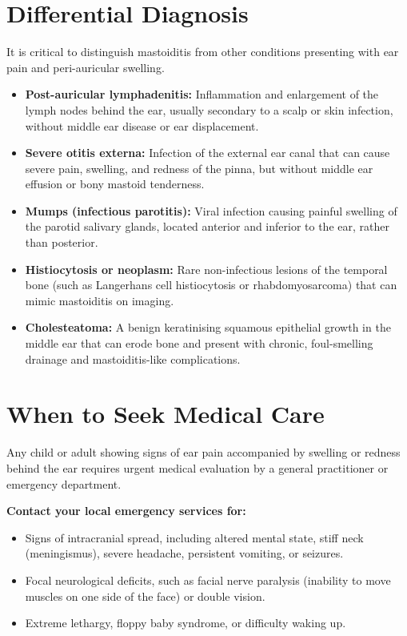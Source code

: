\section*{Differential Diagnosis}
It is critical to distinguish mastoiditis from other conditions presenting with ear pain and peri-auricular swelling.
\begin{itemize}
    \item \textbf{Post-auricular lymphadenitis:} Inflammation and enlargement of the lymph nodes behind the ear, usually secondary to a scalp or skin infection, without middle ear disease or ear displacement.
    \item \textbf{Severe otitis externa:} Infection of the external ear canal that can cause severe pain, swelling, and redness of the pinna, but without middle ear effusion or bony mastoid tenderness.
    \item \textbf{Mumps (infectious parotitis):} Viral infection causing painful swelling of the parotid salivary glands, located anterior and inferior to the ear, rather than posterior.
    \item \textbf{Histiocytosis or neoplasm:} Rare non-infectious lesions of the temporal bone (such as Langerhans cell histiocytosis or rhabdomyosarcoma) that can mimic mastoiditis on imaging.
    \item \textbf{Cholesteatoma:} A benign keratinising squamous epithelial growth in the middle ear that can erode bone and present with chronic, foul-smelling drainage and mastoiditis-like complications.
\end{itemize}

\section*{When to Seek Medical Care}
Any child or adult showing signs of ear pain accompanied by swelling or redness behind the ear requires urgent medical evaluation by a general practitioner or emergency department.

\textbf{Contact your local emergency services for:}
\begin{itemize}
    \item Signs of intracranial spread, including altered mental state, stiff neck (meningismus), severe headache, persistent vomiting, or seizures.
    \item Focal neurological deficits, such as facial nerve paralysis (inability to move muscles on one side of the face) or double vision.
    \item Extreme lethargy, floppy baby syndrome, or difficulty waking up.
\end{itemize}

